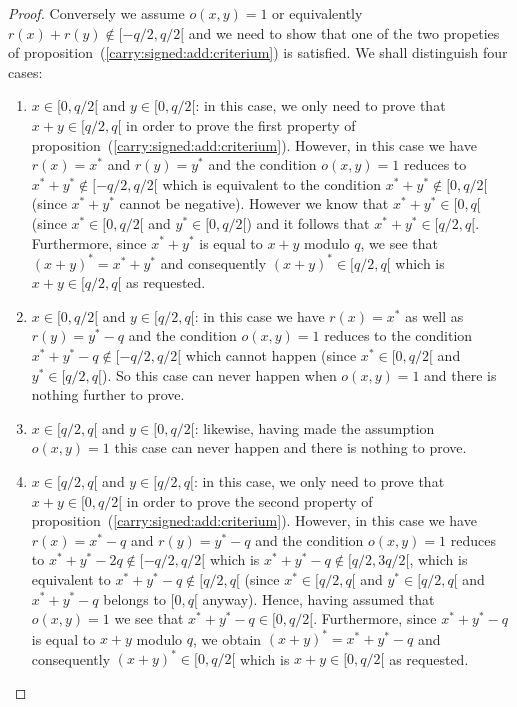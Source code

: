 \documentclass{article}
\begin{document}
\begin{proof}
  Conversely we assume $o(x,y)=1$ or equivalently 
  $r(x)+r(y)\not\in[-q/2,q/2[$ and we need to show that one of
  the two propeties of proposition~(\ref{carry:signed:add:criterium})
  is satisfied. We shall distinguish four cases:
  \begin{enumerate}
    \item $x\in[0,q/2[$ and $y\in[0,q/2[$: in this case, we only
      need to prove that $x+y\in[q/2,q[$ in order to prove the first 
      property of proposition~(\ref{carry:signed:add:criterium}).
      However, in this case we have $r(x)=x^{*}$ and $r(y)=y^{*}$
      and the condition $o(x,y)=1$ reduces to $x^{*}+y^{*}\not\in[-q/2,q/2[$
      which is equivalent to the condition $x^{*}+y^{*}\not\in[0,q/2[$ 
      (since $x^{*}+y^{*}$  cannot be negative). However we know that 
      $x^{*}+y^{*}\in[0,q[$ (since $x^{*}\in[0,q/2[$ and $y^{*}\in[0,q/2[$) 
      and it follows that $x^{*}+y^{*}\in[q/2,q[$. Furthermore, since 
      $x^{*}+y^{*}$ is equal to $x+y$ modulo $q$, we see that 
      $(x+y)^{*}=x^{*}+y^{*}$ and consequently $(x+y)^{*}\in[q/2,q[$ 
      which is $x+y\in[q/2,q[$ as requested.
    \item $x\in[0,q/2[$ and $y\in[q/2,q[$: in this case we have $r(x)=x^{*}$
      as well as $r(y)=y^{*}-q$ and the condition $o(x,y)=1$ reduces to the
      condition $x^{*}+y^{*}-q\not\in[-q/2,q/2[$ which cannot happen (since
      $x^{*}\in[0,q/2[$ and $y^{*}\in[q/2,q[$). So this case can 
      never happen when $o(x,y)=1$ and there is nothing further to 
      prove.
    \item $x\in[q/2,q[$ and $y\in[0,q/2[$: likewise, having made the
      assumption $o(x,y)=1$ this case can never happen and there is 
      nothing to prove.
    \item $x\in[q/2,q[$ and $y\in[q/2,q[$: in this case, we only 
      need to prove that $x+y\in[0,q/2[$ in order to prove the 
      second property of proposition~(\ref{carry:signed:add:criterium}). 
      However, in this case we have $r(x)=x^{*}-q$ and $r(y)=y^{*}-q$
      and the condition $o(x,y)=1$ reduces to 
      $x^{*}+y^{*}-2q\not\in[-q/2,q/2[$ which is $x^{*}+y^{*}-q\not\in
      [q/2,3q/2[$, which is equivalent to $x^{*}+y^{*}-q\not\in[q/2,q[$
      (since $x^{*}\in[q/2,q[$ and $y^{*}\in[q/2,q[$ and $x^{*}+y^{*}-q$
      belongs to $[0,q[$ anyway). Hence, having assumed that $o(x,y)=1$
      we see that $x^{*}+y^{*}-q\in[0,q/2[$. Furthermore, since
      $x^{*}+y^{*}-q$ is equal to $x+y$ modulo $q$, we obtain
      $(x+y)^{*}=x^{*}+y^{*}-q$ and consequently $(x+y)^{*}\in[0,q/2[$
      which is $x+y\in[0,q/2[$ as requested.
  \end{enumerate}
\end{proof}
\end{document}
